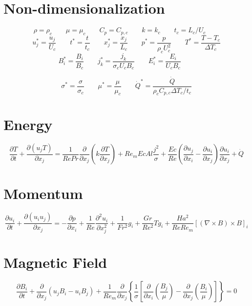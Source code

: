 \documentclass[11pt]{article}
\begin{document}
\section{Non-dimensionalization}
\begin{equation}
	\rho = \rho_c \qquad
	\mu = \mu_c \qquad
	C_p = C_{p,c} \qquad
	k = k_c \qquad
	t_c = L_c/U_c \qquad
\end{equation}
\begin{equation}
	u_j^* = \frac{u_j}{U_c} \qquad
	t^* = \frac{t}{t_c} \qquad
	x_j^* = \frac{x_j}{L_c} \qquad
	p^* = \frac{p}{\rho_c U_c^2} \qquad
	T^* = \frac{T - T_c}{\Delta T_c}
\end{equation}
\begin{equation}
	B_i^* = \frac{B_i}{B_c}  \qquad
	j_k^* = \frac{j_k}{\sigma_c U_c B_c} \qquad
	E_i^* = \frac{E_i}{U_c B_c} \qquad
\end{equation}

\begin{equation}
	\sigma^* = \frac{\sigma}{\sigma_c} \qquad
	\mu^* = \frac{\mu}{\mu_c} \qquad
	\dot{Q}^* = \frac{\dot{Q}}{\rho_c C_{p,c} \Delta T_c / t_c}
\end{equation}






\section{Energy}
\Large
\begin{equation}
	\frac{\partial T}{\partial t} +
	\frac{\partial (u_j T)}{\partial x_j}
	= 
	\frac{1}{Re Pr}
	\frac{\partial}{\partial x_j}
	\left( 
	k \frac{\partial T}{\partial x_j}
	\right) + 
	Re_m Ec Al
	\frac{{j}^2}{\sigma} +
	\frac{Ec}{Re}
	\left(
	\frac{\partial u_j}{\partial x_i}
	-
	\frac{\partial u_i}{\partial x_j}
	\right)
	\frac{\partial u_i}{\partial x_j} +
	\dot{Q}
\end{equation}
\section{Momentum}
\begin{equation}
	\frac{\partial u_i}{\partial t} + 
	\frac{\partial (u_i u_j)}{\partial x_j}
	= 
	- \frac{\partial p}{\partial x_i}
	+ \frac{1}{Re}
	\frac{\partial^2 u_i}{\partial x_j^2}
	+ \frac{1}{Fr^2}
	g_i
	+ \frac{Gr}{Re^2}
	T g_i
	+ \frac{Ha^2}{Re Re_m}
	[(\nabla \times B) \times B]_i
\end{equation}
\section{Magnetic Field}
\begin{equation}
	\frac{\partial B_i}{\partial t} 
	+ \frac{\partial}{\partial x_j} (u_j B_i - u_i B_j) 
	+ \frac{1}{Re_m}
	\frac{\partial}{\partial x_j} 
	\left\{ \frac{1}{\sigma} 
	\left[ 
	\frac{\partial}{\partial x_i} 
	\left( \frac{B_j}{\mu} \right) - 
	\frac{\partial}{\partial x_j} 
	\left( \frac{B_i}{\mu} \right)
	\right]
	\right\} = 0
\end{equation}
\end{document}
